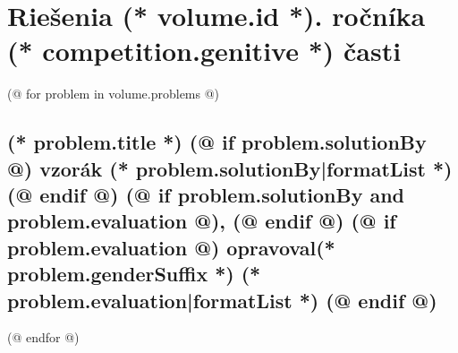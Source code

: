 \documentclass[12pt, twoside]{article}
\newcounter{volume}
\newcounter{problem}
\begin{document}
            
    \pagestyle{main}
    \thispagestyle{first}
    \vspace*{2em}
   
    \section{\texorpdfstring{Riešenia (* volume.id *). ročníka (* competition.genitive *) časti}{Riešenia}}
        
    \pagestyle{solutions}

    (@ for problem in volume.problems @)%
    \setcounter{volume}{(* volume.number *)}%
    \setcounter{problem}{(* problem.number *)}%

    \subsection{%
        \texorpdfstring{%
            \large \textbf{(* problem.title *)} \hfill \normalsize%
            (@ if problem.solutionBy @)%
                vzorák (* problem.solutionBy|formatList *)%
            (@ endif @)%
            (@ if problem.solutionBy and problem.evaluation @), (@ endif @)%
            (@ if problem.evaluation @)%
                opravoval(* problem.genderSuffix *) (* problem.evaluation|formatList *)%
            (@ endif @)%
        }{(* problem.title *)}%
    }
    (@ endfor @)
\end{document}
